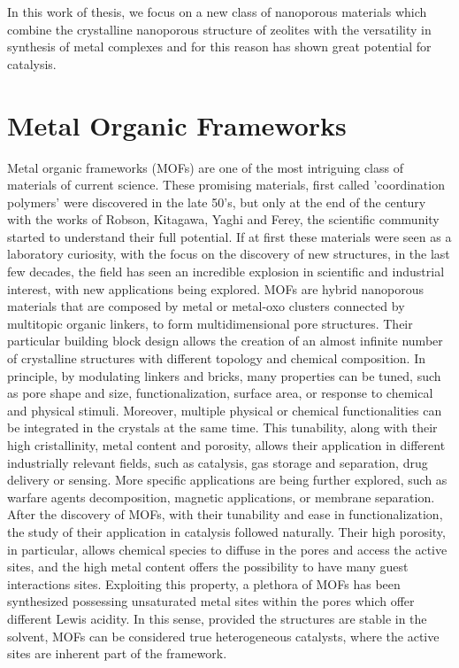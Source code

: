 In this work of thesis, we focus on a new class of nanoporous materials which combine the crystalline nanoporous structure of zeolites with the versatility in synthesis of metal complexes and for this reason has shown great potential for catalysis.

\section{Metal Organic Frameworks}
Metal organic frameworks (MOFs) are one of the most intriguing class of materials of current science. These promising materials, first called 'coordination polymers' were discovered in the late 50's, but only at the end of the century with the works of Robson, Kitagawa, Yaghi and Ferey, the scientific community started to understand their full potential. If at first these materials were seen as a laboratory curiosity, with the focus on the discovery of new structures, in the last few decades, the field has seen an incredible explosion in scientific and industrial interest, with new applications being explored. MOFs are hybrid nanoporous materials that are composed by metal or metal-oxo clusters connected by multitopic organic linkers, to form multidimensional pore structures. Their particular building block design allows the creation of an almost infinite number of crystalline structures with different topology and chemical composition. In principle, by modulating linkers and bricks, many properties can be tuned, such as pore shape and size, functionalization, surface area, or response to chemical and physical stimuli. Moreover, multiple physical or chemical functionalities can be integrated in the crystals at the same time. This tunability, along with their high cristallinity, metal content and porosity, allows their application in different industrially relevant fields, such as catalysis, gas storage and separation, drug delivery or sensing. More specific applications are being further explored, such as warfare agents decomposition, magnetic applications, or membrane separation. After the discovery of MOFs, with their tunability and ease in functionalization, the study of their application in catalysis followed naturally. Their high porosity, in particular, allows chemical species to diffuse in the pores and access the active sites, and the high metal content offers the possibility to have many guest interactions sites. Exploiting this property, a plethora of MOFs has been synthesized possessing unsaturated metal sites within the pores which offer different Lewis acidity. In this sense, provided the structures are stable in the solvent, MOFs can be considered true heterogeneous catalysts, where the active sites are inherent part of the framework. 

